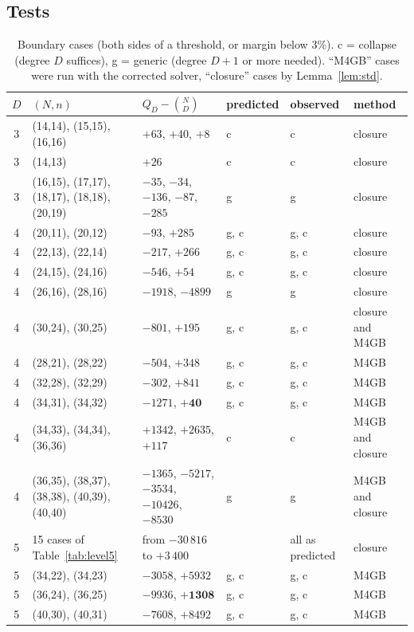 \documentclass[11pt,a4paper]{article}
\theoremstyle{remark}\newtheorem{remark}{Remark}
\begin{document}
\subsection{Tests}

\begin{table}[ht]\centering\footnotesize
\caption{Boundary cases (both sides of a threshold, or margin below 3\%). c = collapse (degree $D$ suffices), g = generic (degree $D+1$ or more needed). ``M4GB'' cases were run with the corrected solver, ``closure'' cases by Lemma~\ref{lem:std}.}\label{tab:boundary}
\begin{tabular}{cp{3.9cm}p{4.3cm}p{1.4cm}p{1.6cm}p{2.0cm}}
\toprule
$D$ & $(N,n)$ & $Q_D-\binom ND$ & predicted & observed & method\\
\midrule
3 & (14,14), (15,15), (16,16) & $+63$, $+40$, $+8$ & c & c & closure\\
3 & (14,13) & $+26$ & c & c & closure\\
3 & (16,15), (17,17), (18,17), (18,18), (20,19) & $-35$, $-34$, $-136$, $-87$, $-285$ & g & g & closure\\
4 & (20,11), (20,12) & $-93$, $+285$ & g, c & g, c & closure\\
4 & (22,13), (22,14) & $-217$, $+266$ & g, c & g, c & closure\\
4 & (24,15), (24,16) & $-546$, $+54$ & g, c & g, c & closure\\
4 & (26,16), (28,16) & $-1918$, $-4899$ & g & g & closure\\
4 & (30,24), (30,25) & $-801$, $+195$ & g, c & g, c & closure and M4GB\\
4 & (28,21), (28,22) & $-504$, $+348$ & g, c & g, c & M4GB\\
4 & (32,28), (32,29) & $-302$, $+841$ & g, c & g, c & M4GB\\
4 & (34,31), (34,32) & $-1271$, $\mathbf{+40}$ & g, c & g, c & M4GB\\
4 & (34,33), (34,34), (36,36) & $+1342$, $+2635$, $+117$ & c & c & M4GB and closure\\
4 & (36,35), (38,37), (38,38), (40,39), (40,40) & $-1365$, $-5217$, $-3534$, $-10426$, $-8530$ & g & g & M4GB and closure\\
5 & 15 cases of Table~\ref{tab:level5} & from $-30\,816$ to $+3\,400$ & & all as predicted & closure\\
5 & (34,22), (34,23) & $-3058$, $+5932$ & g, c & g, c & M4GB\\
5 & (36,24), (36,25) & $-9936$, $\mathbf{+1308}$ & g, c & g, c & M4GB\\
5 & (40,30), (40,31) & $-7608$, $+8492$ & g, c & g, c & M4GB\\
\bottomrule
\end{tabular}
\end{table}
\end{document}
